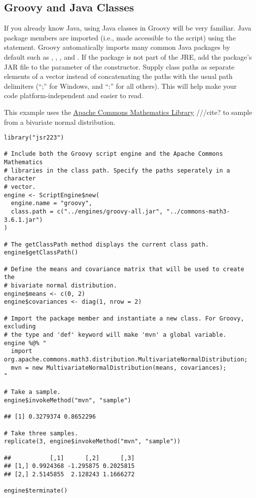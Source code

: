 \subsection{Groovy and Java Classes}

If you already know Java, using Java classes in Groovy will be very familiar. Java package members are imported (i.e., made accessible to the script) using the  statement. Groovy automatically imports many common Java packages by default such as , , , and . If the package is not part of the JRE, add the package's JAR file to the  parameter of the  constructor.  Supply class paths as separate elements of a vector instead of concatenating the paths with the usual path delimiters (“;” for Windows, and “:” for all others). This will help make your code platform-independent and easier to read.

This example uses the \href{http://commons.apache.org/proper/commons-math/}{Apache Commons Mathematics Library} ///cite? to sample from a bivariate normal distribution.

\begin{verbatim}
library("jsr223")

# Include both the Groovy script engine and the Apache Commons Mathematics 
# libraries in the class path. Specify the paths seperately in a character
# vector.
engine <- ScriptEngine$new(
  engine.name = "groovy",
  class.path = c("../engines/groovy-all.jar", "../commons-math3-3.6.1.jar")
)

# The getClassPath method displays the current class path.
engine$getClassPath()

# Define the means and covariance matrix that will be used to create the
# bivariate normal distribution.
engine$means <- c(0, 2)
engine$covariances <- diag(1, nrow = 2)

# Import the package member and instantiate a new class. For Groovy, excluding
# the type and 'def' keyword will make 'mvn' a global variable.
engine %@% "
  import org.apache.commons.math3.distribution.MultivariateNormalDistribution;
  mvn = new MultivariateNormalDistribution(means, covariances);
"

# Take a sample.
engine$invokeMethod("mvn", "sample")

## [1] 0.3279374 0.8652296

# Take three samples.
replicate(3, engine$invokeMethod("mvn", "sample"))

##           [,1]      [,2]      [,3]
## [1,] 0.9924368 -1.295875 0.2025815
## [2,] 2.5145855  2.128243 1.1666272

engine$terminate()
\end{verbatim}

